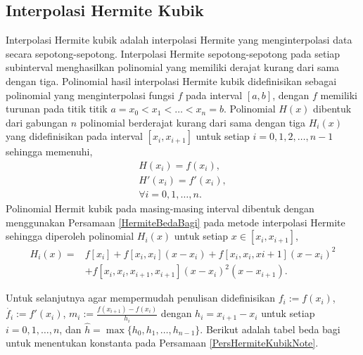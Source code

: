 \subsection{Interpolasi Hermite Kubik}
Interpolasi Hermite kubik adalah interpolasi Hermite yang menginterpolasi data secara sepotong-sepotong. Interpolasi Hermite sepotong-sepotong pada setiap subinterval menghasilkan polinomial yang memiliki derajat kurang dari sama dengan tiga. Polinomial hasil interpolasi Hermite kubik didefinisikan sebagai polinomial yang menginterpolasi fungsi $f$ pada interval $[a,b]$, dengan $ f $ memiliki turunan pada titik titik $ a=x_0<x_1<\dots<x_n=b $. Polinomial $ H(x) $ dibentuk dari gabungan $ n $ polinomial berderajat kurang dari sama dengan tiga $ H_i(x) $ yang didefinisikan pada interval $ [x_i,x_{i+1}] $ untuk setiap $ i=0,1,2,\dots,n-1 $ sehingga memenuhi, 
\begin{align*}
	H(x_i) = f(x_i),\\
	H'(x_i) = f'(x_i),\\
	\forall i = 0,1,\dots,n.
\end{align*}
Polinomial Hermit kubik pada masing-masing interval dibentuk dengan menggunakan Persamaan \eqref{HermiteBedaBagi} pada metode interpolasi Hermite sehingga diperoleh polinomial $H_i(x)$ untuk setiap $x\in[x_i,x_{i+1}]$, 
\begin{equation}\label{PersHermiteKubikNote}
    \begin{split}
    H_i(x)=&f[x_i] + f[x_i,x_i](x-x_i) + f[x_i,x_i,x{i+1}](x-x_i)^2 \\
    &+ f[x_i,x_i,x_{i+1},x_{i+1}](x-x_i)^2(x-x_{i+1}).
    \end{split}
\end{equation}

Untuk selanjutnya agar mempermudah penulisan didefinisikan \(f_i:=f(x_i)\), \(\dot{f_i}:=f'(x_i)\), \(m_i:=\frac{f(x_{i+1})-f(x_i)}{h_i}\) dengan \(h_i=x_{i+1}-x_i\) untuk setiap \(i=0,1,\dots,n\), dan $ \hat{h}=\max\{h_0,h_1,\dots,h_{n-1}\} $. Berikut adalah tabel beda bagi untuk menentukan konstanta pada Persamaan \eqref{PersHermiteKubikNote}.

